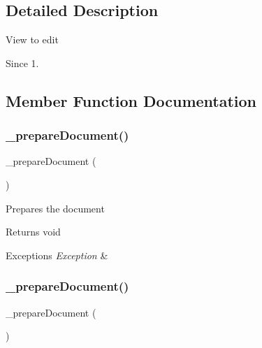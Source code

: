 \subsection{Detailed Description}
View to edit

\begin{DoxySince}{Since}
1. 
\end{DoxySince}


\subsection{Member Function Documentation}
\mbox{\label{classtks__agenda_view_item_aa6beb02534f5e57801141ad50e7adec5}} 
\subsubsection{\+\_\+prepare\+Document()\hspace{0.1cm}{\footnotesize\ttfamily [1/2]}}
{\footnotesize\ttfamily \+\_\+prepare\+Document (\begin{DoxyParamCaption}{ }\end{DoxyParamCaption})\hspace{0.3cm}{\ttfamily [protected]}}

Prepares the document

\begin{DoxyReturn}{Returns}
void
\end{DoxyReturn}

\begin{DoxyExceptions}{Exceptions}
{\em Exception} & \\
\hline
\end{DoxyExceptions}
\mbox{\label{classtks__agenda_view_item_aa6beb02534f5e57801141ad50e7adec5}} 
\subsubsection{\+\_\+prepare\+Document()\hspace{0.1cm}{\footnotesize\ttfamily [2/2]}}
{\footnotesize\ttfamily \+\_\+prepare\+Document (\begin{DoxyParamCaption}{ }\end{DoxyParamCaption})\hspace{0.3cm}{\ttfamily [protected]}}

